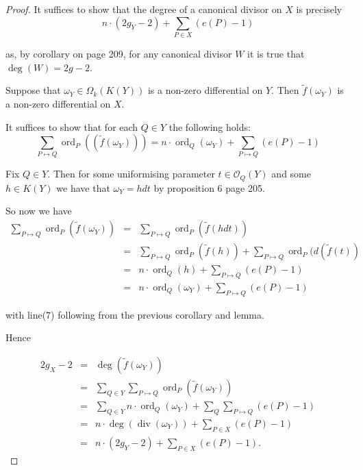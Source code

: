 \documentclass[11pt]{article} %
\DeclareMathOperator{\di}{div}
\DeclareMathOperator{\ord}{ord}
\begin{document}
\begin{proof}
	It suffices to show that the degree of a canonical divisor on $X$ is precisely 
		\begin{equation*}
			n\cdot (2g_{Y}-2)+\sum_{P\in X}(e(P)-1)
		\end{equation*}

	as, by corollary on page 209, for any canonical divisor $W$ it is true that $\deg(W)=2g-2$.

	Suppose that $\omega_{Y}\in \Omega_{k}(K(Y))$ is a non-zero differential on $Y$. Then $\tilde{f}				(\omega_{Y})$ is a non-zero differential on $X$.

	It suffices to show that for each $Q\in Y$ the following holds:
		\begin{equation*}
			\sum_{P\mapsto Q}\ord_{P}((\tilde{f}(\omega_{Y})))=n\cdot \ord_{Q}								(\omega_{Y})+\sum_{P\mapsto Q}(e(P)-1)
		\end{equation*}

	Fix $Q\in Y$. Then for some uniformising parameter $t\in \mathscr{O}_{Q}(Y)$ and some $h\in K(Y)$ we have 			that $\omega_{Y}=hdt$ by proposition 6 page 205.

	So now we have
		\begin{eqnarray}
			\sum_{P\mapsto Q}\ord_{P}(\tilde{f}(\omega_{Y})) & = & \sum_{P\mapsto Q}\ord_{P}(\tilde{f}					(hdt)) \\
			& = & \sum_{P\mapsto Q} \ord_{P}(\tilde{f}(h)) + \sum_{P\mapsto Q} \ord_{P}(d(\tilde{f}(t)) \\
			& = & n\cdot \ord_{Q}(h) + \sum_{P\mapsto Q} (e(P)-1) \\
			& = & n\cdot \ord_{Q}(\omega_{Y}) + \sum_{P\mapsto Q} (e(P)-1) 
		\end{eqnarray}

	with line(7) following from the previous corollary and lemma.

	Hence

		\begin{eqnarray*}
			2g_{X}-2 & = & \deg(\tilde{f}(\omega_{Y})) \\
			& = & \sum_{Q\in Y} \sum_{P\mapsto Q} \ord_{P}(\tilde{f}(\omega_{Y})) \\
			& = & \sum_{Q\in Y} n\cdot \ord_{Q}(\omega_{Y}) + \sum_{Q}\sum_{P\mapsto Q} (e(P)-1) \\
			& = & n\cdot \deg(\di(\omega_{Y})) +\sum_{P\in X} (e(P)-1) \\
			& = & n\cdot (2g_{Y}-2) + \sum_{P\in X}(e(P)-1).
		\end{eqnarray*}
\end{proof}
\end{document}
